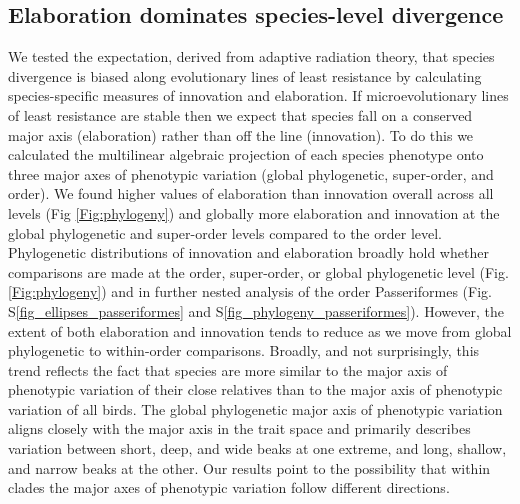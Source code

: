 \documentclass[12pt,letterpaper]{article}
\begin{document}
\subsection{Elaboration dominates species-level divergence}
We tested the expectation, derived from adaptive radiation theory, that species divergence is biased along evolutionary lines of least resistance by calculating species-specific measures of innovation and elaboration.
If microevolutionary lines of least resistance are stable then we expect that species fall on a conserved major axis (elaboration) rather than off the line (innovation).
To do this we calculated the multilinear algebraic projection of each species phenotype onto three major axes of phenotypic variation (global phylogenetic, super-order, and order).
We found higher values of elaboration than innovation overall across all levels (Fig \ref{Fig:phylogeny}) and globally more elaboration and innovation at the global phylogenetic and super-order levels compared to the order level.
Phylogenetic distributions of innovation and elaboration broadly hold whether comparisons are made at the order, super-order, or global phylogenetic level (Fig. \ref{Fig:phylogeny})%
 and in further nested analysis of the order Passeriformes (Fig. S\ref{fig_ellipses_passeriformes} and S\ref{fig_phylogeny_passeriformes}).
However, the extent of both elaboration and innovation tends to reduce as we move from global phylogenetic to within-order comparisons.
Broadly, and not surprisingly, this trend reflects the fact that species are more similar to the major axis of phenotypic variation of their close relatives than to the major axis of phenotypic variation of all birds.
The global phylogenetic major axis of phenotypic variation aligns closely with the major axis in the trait space and primarily describes variation between short, deep, and wide beaks at one extreme, and long, shallow, and narrow beaks at the other.
Our results point to the possibility that within clades the major axes of phenotypic variation follow different directions. 
\end{document}
